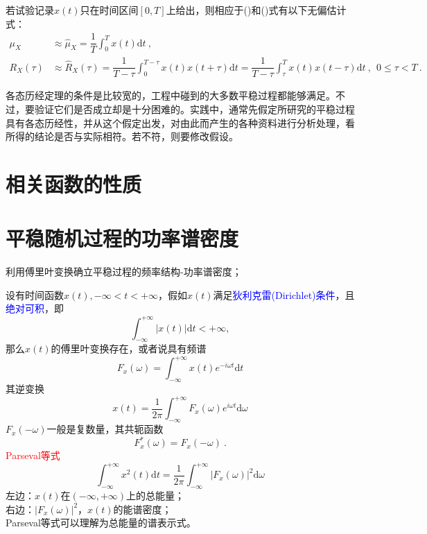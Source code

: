 \documentclass[12pt,a4paper]{article}
\newcommand{\dif}{\mathrm{d}}
\begin{document}
若试验记录$x(t)$只在时间区间$[0,T]$上给出，则相应于()和()式有以下无偏估计式：
\begin{align}
\mu_X &\approx \hat{\mu}_X = \dfrac{1}{T} \int_0^T x(t) \dif t ~, \\
R_X(\tau) &\approx \hat{R}_X(\tau) = \dfrac{1}{T -\tau} \int_0^{T-\tau} x(t) x(t+\tau) \dif t  = \dfrac{1}{T -\tau} \int_\tau^{T} x(t) x(t-\tau) \dif t ~, ~~ 0 \leqslant \tau < T ~.
\end{align}






各态历经定理的条件是比较宽的，工程中碰到的大多数平稳过程都能够满足。不过，要验证它们是否成立却是十分困难的。实践中，通常先假定所研究的平稳过程具有各态历经性，并从这个假定出发，对由此而产生的各种资料进行分析处理，看所得的结论是否与实际相符。若不符，则要修改假设。




\section{相关函数的性质}

\section{平稳随机过程的功率谱密度}

利用傅里叶变换确立平稳过程的频率结构-功率谱密度；

设有时间函数$x(t), -\infty < t < +\infty$，假如$x(t)$满足\textcolor{blue}{狄利克雷(Dirichlet)条件}，且\textcolor{blue}{绝对可积}，即
\begin{equation}
\int_{-\infty}^{+\infty} |x(t)| \dif t < +\infty,
\end{equation}
那么$x(t)$的傅里叶变换存在，或者说具有频谱
\begin{equation}
F_x(\omega) = \int_{-\infty}^{+\infty} x(t) e^{-i\omega t} \dif t
\end{equation}
其逆变换
\begin{equation}
x(t) = \frac{1}{2\pi} \int_{-\infty}^{+\infty} F_x(\omega) e^{i\omega t} \dif \omega
\end{equation}
$ F_x(-\omega)$一般是复数量，其共轭函数
\begin{equation}
F^*_x(\omega) = F_x(-\omega) ~.
\end{equation}
\textcolor{red}{Parseval等式}
\begin{equation}
\int_{-\infty}^{+\infty} x^2(t) \dif t = \frac{1}{2\pi} \int_{-\infty}^{+\infty} |F_x(\omega)|^2 \dif \omega
\end{equation}
左边：$x(t)$在$(-\infty, +\infty)$上的总能量；\\
右边：$|F_x(\omega)|^2$，$x(t)$的能谱密度；\\
Parseval等式可以理解为总能量的谱表示式。
\end{document}
